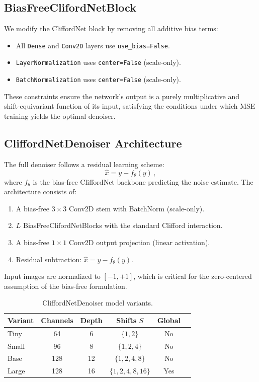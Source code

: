\documentclass{article}
\begin{document}
\subsection{BiasFreeClifordNetBlock}

We modify the CliffordNet block by removing all additive bias terms:

\begin{itemize}
  \item All \texttt{Dense} and \texttt{Conv2D} layers use \texttt{use\_bias=False}.
  \item \texttt{LayerNormalization} uses \texttt{center=False} (scale-only).
  \item \texttt{BatchNormalization} uses \texttt{center=False} (scale-only).
\end{itemize}

These constraints ensure the network's output is a purely multiplicative and shift-equivariant function of its input, satisfying the conditions under which MSE training yields the optimal denoiser.

\subsection{CliffordNetDenoiser Architecture}

The full denoiser follows a residual learning scheme:
\begin{equation}
  \hat{x} = y - f_\theta(y)\,,
  \label{eq:residual}
\end{equation}
where $f_\theta$ is the bias-free CliffordNet backbone predicting the noise estimate.
The architecture consists of:
\begin{enumerate}
  \item A bias-free $3 \times 3$ Conv2D stem with BatchNorm (scale-only).
  \item $L$ BiasFreeClifordNetBlocks with the standard Clifford interaction.
  \item A bias-free $1 \times 1$ Conv2D output projection (linear activation).
  \item Residual subtraction: $\hat{x} = y - f_\theta(y)$.
\end{enumerate}

Input images are normalized to $[-1, +1]$, which is critical for the zero-centered assumption of the bias-free formulation.

\begin{table}[t]
\centering
\caption{CliffordNetDenoiser model variants.}
\label{tab:denoiser_variants}
\begin{tabular}{lccccc}
\toprule
\textbf{Variant} & \textbf{Channels} & \textbf{Depth} & \textbf{Shifts $S$} & \textbf{Global} \\
\midrule
Tiny  & 64  & 6  & $\{1, 2\}$           & No  \\
Small & 96  & 8  & $\{1, 2, 4\}$        & No  \\
Base  & 128 & 12 & $\{1, 2, 4, 8\}$     & No  \\
Large & 128 & 16 & $\{1, 2, 4, 8, 16\}$ & Yes \\
\bottomrule
\end{tabular}
\end{table}
\end{document}
